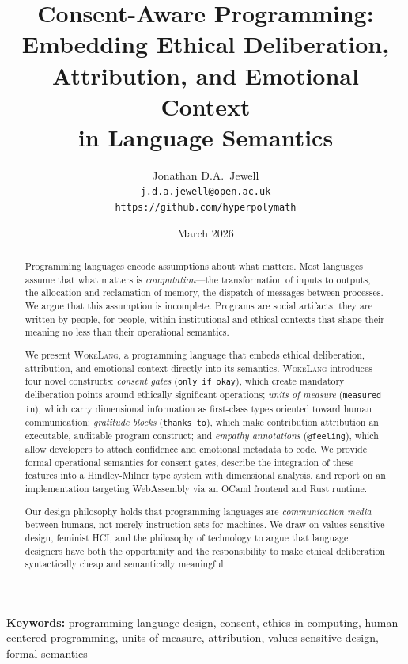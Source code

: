 \documentclass[11pt,a4paper]{article}
\title{%
  \textbf{Consent-Aware Programming:}\\[0.3em]
  \large Embedding Ethical Deliberation, Attribution, and Emotional Context\\
  in Language Semantics%
}
\author{%
  Jonathan D.A.\ Jewell\\
  \texttt{j.d.a.jewell@open.ac.uk}\\
  \texttt{https://github.com/hyperpolymath}%
}
\date{March 2026}
\newcommand{\WokeLang}{\textsc{WokeLang}}
\begin{document}
\maketitle

\begin{abstract}
Programming languages encode assumptions about what matters.
Most languages assume that what matters is \emph{computation}---the
transformation of inputs to outputs, the allocation and reclamation of
memory, the dispatch of messages between processes.  We argue that this
assumption is incomplete.  Programs are social artifacts: they are
written by people, for people, within institutional and ethical
contexts that shape their meaning no less than their operational
semantics.

We present \WokeLang{}, a programming language that embeds ethical
deliberation, attribution, and emotional context directly into its
semantics.  \WokeLang{} introduces four novel constructs:
\emph{consent gates} (\texttt{only if okay}), which create mandatory
deliberation points around ethically significant operations;
\emph{units of measure} (\texttt{measured in}), which carry
dimensional information as first-class types oriented toward human
communication; \emph{gratitude blocks} (\texttt{thanks to}), which
make contribution attribution an executable, auditable program
construct; and \emph{empathy annotations} (\texttt{@feeling}), which
allow developers to attach confidence and emotional metadata to code.
We provide formal operational semantics for consent gates, describe
the integration of these features into a Hindley-Milner type system
with dimensional analysis, and report on an implementation targeting
WebAssembly via an OCaml frontend and Rust runtime.

Our design philosophy holds that programming languages are
\emph{communication media} between humans, not merely instruction sets
for machines.  We draw on values-sensitive design, feminist HCI, and
the philosophy of technology to argue that language designers have both
the opportunity and the responsibility to make ethical deliberation
syntactically cheap and semantically meaningful.
\end{abstract}

\vspace{0.5em}
\noindent\textbf{Keywords:} programming language design, consent,
ethics in computing, human-centered programming, units of measure,
attribution, values-sensitive design, formal semantics
\end{document}
